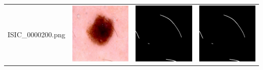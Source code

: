 \begin{table}[tbh!]
{\begin{tabular}{cccc}
			\begin{sideways}\;\;\;\;\;ISIC\_0000200.png\end{sideways} & \includegraphics[width=.33\textwidth ,keepaspectratio]{images/ongoing/derm/ISIC_0000200.png}                   &     \includegraphics[width=.33\textwidth ,keepaspectratio]{images/ongoing/mask/ISIC_0000200.png}        &     \includegraphics[width=.33\textwidth ,keepaspectratio]{images/ongoing/mask/ISIC_0000200.png}      \\\cmidrule(lr){1-4} 

\end{tabular}}
\end{table}
